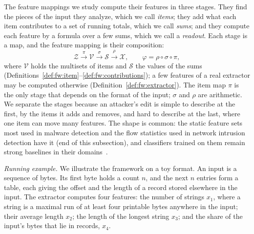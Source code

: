 The feature mappings we study compute their features in three stages. They find the pieces of the input they
analyze, which we call \emph{items}; they add what each item contributes to a set of running totals, which we call
\emph{sums}; and they compute each feature by a formula over a few sums, which we call a \emph{readout}. Each stage is
a map, and the feature mapping is their composition:
\begin{equation}
  \label{eq:fw:factorization}
  \mathcal{Z} \xrightarrow{\;\pi\;} \mathcal{V} \xrightarrow{\;\sigma\;} \mathcal{S}
  \xrightarrow{\;\rho\;} \mathcal{X},
  \qquad
  \varphi = \rho \circ \sigma \circ \pi,
\end{equation}
where $\mathcal{V}$ holds the multisets of items and $\mathcal{S}$ the values of the sums
(Definitions~\ref{def:fw:item}--\ref{def:fw:contributions}); a few features of a real extractor may be computed
otherwise (Definition~\ref{def:fw:extractor}). The item map $\pi$ is the only stage that depends on the format of the
input; $\sigma$ and $\rho$ are arithmetic. We separate the stages because an attacker's edit is simple to describe at the first, by the items it adds and removes, and hard to describe at the
last, where one item can move many features. The shape is common: the static feature sets most used in malware
detection and the flow statistics used in network intrusion detection have it (end of this subsection), and
classifiers trained on them remain strong baselines in their domains~\cite{anderson2018ember,arp2014drebin}.

\begin{runex}
\emph{Running example.} We illustrate the framework on a toy format. An input is a sequence of bytes. Its first byte
holds a count $n$, and the next $n$ entries form a table, each giving the offset and the length of a record stored
elsewhere in the input. The extractor computes four features: the number of strings $x_1$, where a string is a maximal
run of at least four printable bytes anywhere in the input; their average length $x_2$; the length of the longest
string $x_3$; and the share of the input's bytes that lie in records, $x_4$.
\end{runex}

